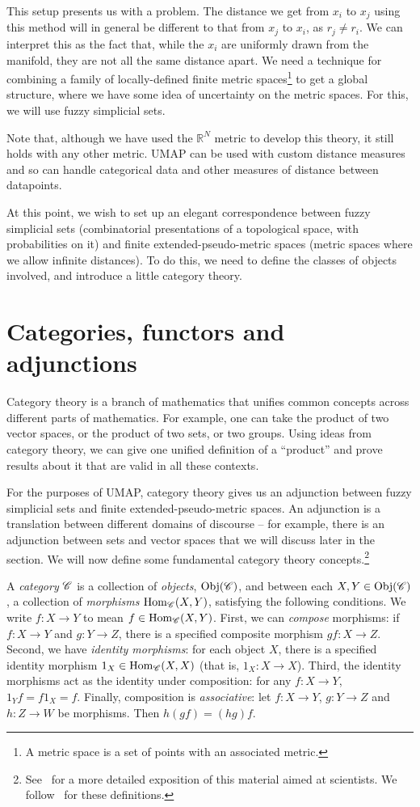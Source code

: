 \documentclass[a4paper,11pt,leqno]{article} \usepackage{amsmath}
\newcommand{\RR}{\mathbb{R}} \newcommand{\QQ}{\mathbb{Q}}
\newcommand{\Hom}{\ensuremath{\operatorname{Hom}}}
\newcommand{\Obj}{\ensuremath{\operatorname{Obj}}} \newtheorem*{thm}{Theorem}
\theoremstyle{definition} \newtheorem{defn}{Definition}
\begin{document}
This setup presents us with a problem. The distance we get from $x_i$ to $x_j$
using this method will in general be different to that from $x_j$ to $x_i$, as
$r_j\not= r_i$. We can interpret this as the fact that, while the $x_i$ are
uniformly drawn from the manifold, they are not all the same distance apart. We
need a technique for combining a family of locally-defined finite metric
spaces\footnote{ A metric space is a set of points with an associated metric.}
to get a global structure, where we have some idea of uncertainty on the metric
spaces.  For this, we will use fuzzy simplicial sets.

Note that, although we have used the $\RR^N$ metric to develop this theory, it
still holds with any other metric.  UMAP can be used with custom distance
measures and so can handle categorical data and other measures of distance
between datapoints.

At this point, we wish to set up an elegant correspondence between fuzzy
simplicial sets (combinatorial presentations of a topological space, with
probabilities on it) and finite extended-pseudo-metric spaces (metric spaces
where we allow infinite distances). To do this, we need to define the classes of
objects involved, and introduce a little category theory.

\section{Categories, functors and adjunctions}

Category theory is a branch of mathematics that unifies common concepts across
different parts of mathematics.  For example, one can take the product of two
vector spaces, or the product of two sets, or two groups.  Using ideas from
category theory, we can give one unified definition of a ``product'' and prove
results about it that are valid in all these contexts.

For the purposes of UMAP, category theory gives us an adjunction between fuzzy
simplicial sets and finite extended-pseudo-metric spaces.  An adjunction is
a translation between different domains of discourse -- for example, there is an
adjunction between sets and vector spaces that we will discuss later in the
section.  We will now define some fundamental category theory
concepts.\footnote{ See~\cite{Spivak18} for a more detailed exposition of this
material aimed at scientists.  We follow~\cite{Riehl} for these definitions.}

A \emph{category} $\mathscr{C}$ is a collection of \emph{objects}, $\Obj(\curC)$, and
between each $X, Y\in\Obj(\curC)$, a collection of \emph{morphisms}
$\Hom_{\curC}(X, Y)$, satisfying the following conditions.  We write $f: X\to Y$
to mean $f\in \Hom_{\curC}(X, Y)$.  First, we can \emph{compose} morphisms: if
$f: X\to Y$ and $g: Y\to Z$, there is a specified composite morphism $gf: X\to
Z$.  Second, we have \emph{identity morphisms}: for each object $X$, there is
a specified {identity} morphism $1_X \in \Hom_{\curC}(X, X)$ (that is, $1_X:
X\to X$).  Third, the identity morphisms act as the identity under composition:
for any $f: X\to Y$, $1_Yf = f1_X = f$.  Finally, composition is
\emph{associative}: let $f: X\to Y$, $g: Y\to Z$ and $h: Z\to W$ be morphisms.
Then $h(gf) = (hg)f$.
\end{document}
